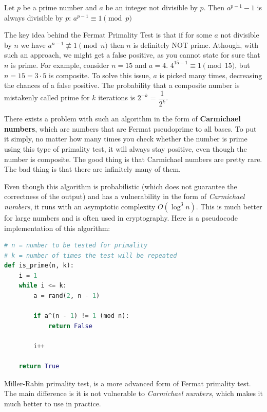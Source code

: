 \documentclass[../lecture-notes.tex]{subfiles}
\begin{document}
\begin{theorem}
    Let $p$ be a prime number and $a$ be an integer not divisible by $p$. Then $a ^ {p-1} - 1$ is always divisible by $p$:  $a^{p-1} \equiv 1 \pmod{p}$
\end{theorem}

The key idea behind the Fermat Primality Test is that if for some $a$ not divisible by $n$ we have $a^{n-1} \not\equiv 1 \pmod{n}$ then $n$ is definitely NOT prime.
Athough, with such an approach, we might get a false positive, as you cannot state for sure that $n$ is prime. For example, consider $n = 15$ and $a = 4$.
$4^{15-1} \equiv 1 \pmod{15}$, but $n = 15 = 3 \cdot 5$ is composite. To solve this issue, $a$ is picked many times, decreasing the chances of a false positive.
The probability that a composite number is mistakenly called prime for $k$ iterations is $2^{-k}$ = $\dfrac{1}{2^k}$.

There exists a problem with such an algorithm in the form of \textbf{Carmichael numbers}, which are numbers that are Fermat pseudoprime to all bases. To put it simply,
no matter how many times you check whether the number is prime using this type of primality test, it will always stay positive, even though the number is
composite. The good thing is that Carmichael numbers are pretty rare. The bad thing is that there are infinitely many of them. 

Even though this algorithm is probabilistic (which does not guarantee the correctness of the output) and has a vulnerability in the form of \textit{Carmichael numbers},
it runs with an asymptotic complexity $O(\log^3{n})$. This is much better for large numbers and is often used in cryptography. Here is a pseudocode implementation of this algorithm:

\begin{lstlisting}[language=Python]
# n = number to be tested for primality
# k = number of times the test will be repeated
def is_prime(n, k):
    i = 1
    while i <= k:
        a = rand(2, n - 1)

        if a^(n - 1) != 1 (mod n):
            return False

        i++

    return True
\end{lstlisting}

Miller-Rabin primality test, is a more advanced form of Fermat primality test. The main difference is it is not vulnerable to \textit{Carmichael numbers},
which makes it much better to use in practice.
\end{document}
